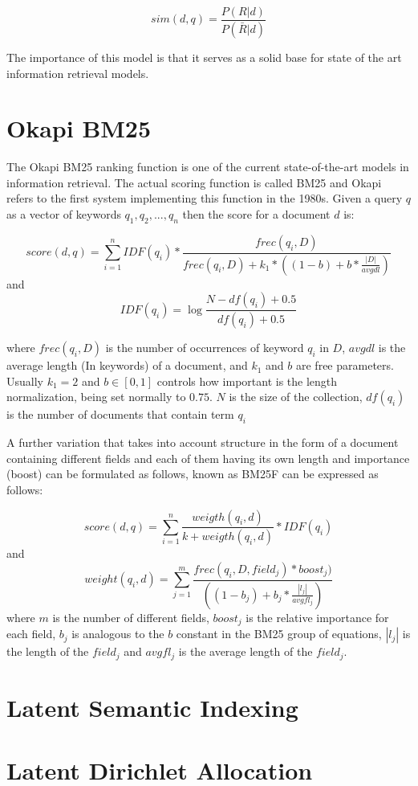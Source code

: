 $$sim(d,q) = \frac{ P(R|d)} {P(\bar{R} |d)} $$

The importance of this model is that it serves as a solid base for state of the art information retrieval models.

\section{Okapi BM25}

The Okapi BM25 ranking function is one of the current state-of-the-art models in information retrieval\cite{okapibm25}. The actual scoring function is called BM25 and Okapi refers to the first system implementing this function in the 1980s. 
Given a query $q$ as a vector of keywords $q_{1}, q_{2}, ... , q_{n}$ then the score for a document $d$ is:

$$score(d, q) = \sum_{i=1}^{n}IDF{(q_i)}*\frac{ frec(q_i, D)}{frec(q_i, D)+k_1*((1-b)+b*\frac{|D|}{avgdl})} $$
and $$IDF(q_i) = \log{\frac{N - df(q_i)+0.5}{df(q_i)+0.5}} $$

where $frec(q_i, D)$ is the number of occurrences of keyword $q_i$ in $D$, $avgdl$ is the average length (In keywords) of a document, and $k_1$ and $b$ are free parameters. Usually $k_1 = 2$ and $b \in [0, 1]$ controls how important is the length normalization, being set normally to $0.75$. $N$ is the size of the collection, $df(q_i)$ is the number of documents that contain term $q_i$ 

A further variation that takes into account structure in the form of a document containing different fields and each of them having its own length and importance (boost) can be formulated as follows, known as BM25F can be expressed as follows:


$$score(d, q) = \sum_{i=1}^{n} \frac{weigth(q_i, d)}{k+ weigth(q_i, d)} * IDF(q_i)$$
and 
$$weight(q_i, d) = \sum_{j=1}^m \frac{frec(q_i, D, field_j)*boost_j)}{((1-b_j) + b_j*\frac{|l_j|}{avgfl_j})} $$
where $m$ is the number of different fields, $boost_j$ is the relative importance for each field, $b_j$ is analogous to the $b$ constant in the BM25 group of equations, $|l_j|$ is the length of the $field_j$ and $avgfl_j$ is the average length of the $field_j$.

\section{Latent Semantic Indexing}

\section{Latent Dirichlet Allocation}

